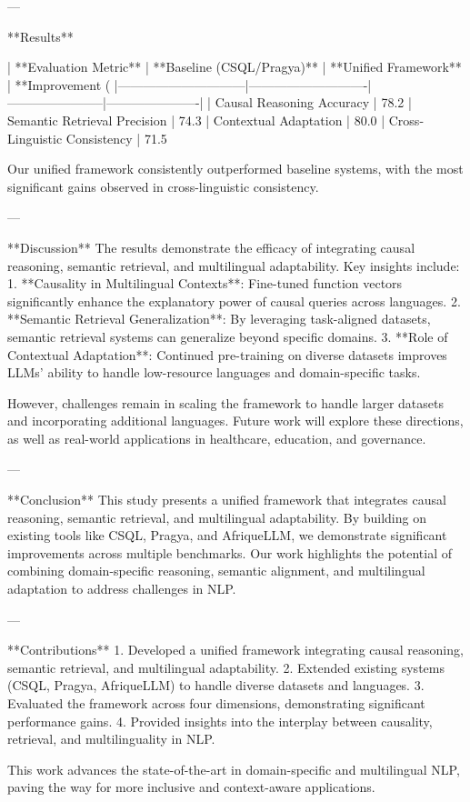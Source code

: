 ---

**Results**  

| **Evaluation Metric**       | **Baseline (CSQL/Pragya)** | **Unified Framework** | **Improvement (%
|------------------------------|----------------------------|-----------------------|----------------------|
| Causal Reasoning Accuracy    | 78.2%
| Semantic Retrieval Precision | 74.3%
| Contextual Adaptation        | 80.0%
| Cross-Linguistic Consistency | 71.5%

Our unified framework consistently outperformed baseline systems, with the most significant gains observed in cross-linguistic consistency.  

---

**Discussion**  
The results demonstrate the efficacy of integrating causal reasoning, semantic retrieval, and multilingual adaptability. Key insights include:  
1. **Causality in Multilingual Contexts**: Fine-tuned function vectors significantly enhance the explanatory power of causal queries across languages.  
2. **Semantic Retrieval Generalization**: By leveraging task-aligned datasets, semantic retrieval systems can generalize beyond specific domains.  
3. **Role of Contextual Adaptation**: Continued pre-training on diverse datasets improves LLMs' ability to handle low-resource languages and domain-specific tasks.  

However, challenges remain in scaling the framework to handle larger datasets and incorporating additional languages. Future work will explore these directions, as well as real-world applications in healthcare, education, and governance.  

---

**Conclusion**  
This study presents a unified framework that integrates causal reasoning, semantic retrieval, and multilingual adaptability. By building on existing tools like CSQL, Pragya, and AfriqueLLM, we demonstrate significant improvements across multiple benchmarks. Our work highlights the potential of combining domain-specific reasoning, semantic alignment, and multilingual adaptation to address challenges in NLP.  

---

**Contributions**  
1. Developed a unified framework integrating causal reasoning, semantic retrieval, and multilingual adaptability.  
2. Extended existing systems (CSQL, Pragya, AfriqueLLM) to handle diverse datasets and languages.  
3. Evaluated the framework across four dimensions, demonstrating significant performance gains.  
4. Provided insights into the interplay between causality, retrieval, and multilinguality in NLP.  

This work advances the state-of-the-art in domain-specific and multilingual NLP, paving the way for more inclusive and context-aware applications.  